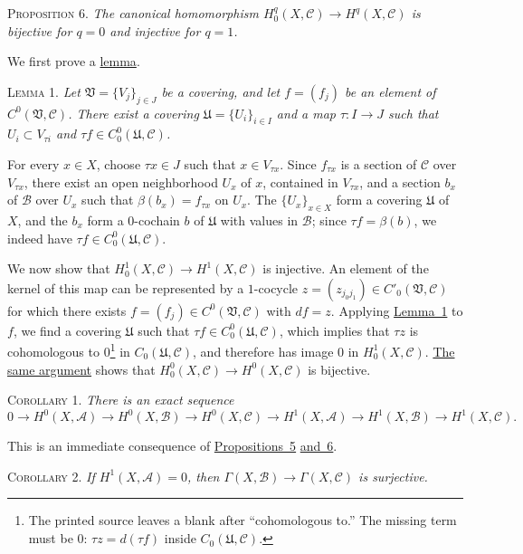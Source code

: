 \label{fac:I:3:no:24:prop:6}
\textsc{Proposition 6.} \textit{The canonical homomorphism $H_0^q(X,\mathcal{C})\to H^q(X,\mathcal{C})$ is bijective for $q=0$ and injective for $q=1$.}

We first prove a \hyperref[fac:I:3:no:24:lemma:1]{lemma}.

\label{fac:I:3:no:24:lemma:1}
\textsc{Lemma 1.} \textit{Let $\mathfrak{V}=\{V_j\}_{j\in J}$ be a covering, and let $f=(f_j)$ be an element of $C^0(\mathfrak{V},\mathcal{C})$. There exist a covering $\mathfrak{U}=\{U_i\}_{i\in I}$ and a map $\tau:I\to J$ such that $U_i\subset V_{\tau i}$ and $\tau f\in C_0^0(\mathfrak{U},\mathcal{C})$.}

For every $x\in X$, choose $\tau x\in J$ such that $x\in V_{\tau x}$. Since $f_{\tau x}$ is a section of $\mathcal{C}$ over $V_{\tau x}$, there exist an open neighborhood $U_x$ of $x$, contained in $V_{\tau x}$, and a section $b_x$ of $\mathcal{B}$ over $U_x$ such that $\beta(b_x)=f_{\tau x}$ on $U_x$. The $\{U_x\}_{x\in X}$ form a covering $\mathfrak{U}$ of $X$, and the $b_x$ form a $0$-cochain $b$ of $\mathfrak{U}$ with values in $\mathcal{B}$; since $\tau f=\beta(b)$, we indeed have $\tau f\in C_0^0(\mathfrak{U},\mathcal{C})$.

\label{fac:I:3:no:24:proof:H1-injectivity}
We now show that $H_0^1(X,\mathcal{C})\to H^1(X,\mathcal{C})$ is injective. An element of the kernel of this map can be represented by a $1$-cocycle $z=(z_{j_0j_1})\in C'_0(\mathfrak{V},\mathcal{C})$ for which there exists $f=(f_j)\in C^0(\mathfrak{V},\mathcal{C})$ with $df=z$. Applying \hyperref[fac:I:3:no:24:lemma:1]{Lemma~1} to $f$, we find a covering $\mathfrak{U}$ such that $\tau f\in C_0^0(\mathfrak{U},\mathcal{C})$, which implies that $\tau z$ is cohomologous to $0$\footnote{The printed source leaves a blank after ``cohomologous to.'' The missing term must be $0$: $\tau z=d(\tau f)$ inside $C_0(\mathfrak{U},\mathcal{C})$.} in $C_0(\mathfrak{U},\mathcal{C})$, and therefore has image $0$ in $H_0^1(X,\mathcal{C})$. \hyperref[fac:I:3:no:24:proof:H1-injectivity]{The same argument} shows that $H_0^0(X,\mathcal{C})\to H^0(X,\mathcal{C})$ is bijective.

\label{fac:I:3:no:24:cor:1}
\textsc{Corollary 1.} \textit{There is an exact sequence}
\[
0\longrightarrow H^0(X,\mathcal{A})
\longrightarrow H^0(X,\mathcal{B})
\longrightarrow H^0(X,\mathcal{C})
\longrightarrow H^1(X,\mathcal{A})
\longrightarrow H^1(X,\mathcal{B})
\longrightarrow H^1(X,\mathcal{C}).
\]

This is an immediate consequence of \hyperref[fac:I:3:no:24:prop:5]{Propositions~5} \hyperref[fac:I:3:no:24:prop:6]{and~6}.

\label{fac:I:3:no:24:cor:2}
\textsc{Corollary 2.} \textit{If $H^1(X,\mathcal{A})=0$, then $\Gamma(X,\mathcal{B})\to\Gamma(X,\mathcal{C})$ is surjective.}
